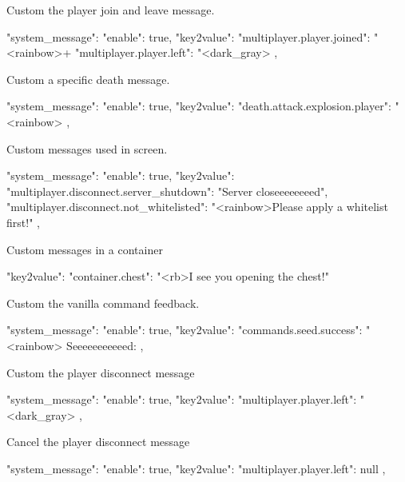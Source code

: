\begin{example}{Custom the player join and leave message.}
    \begin{json}
        "system_message": {
            "enable": true,
            "key2value": {
                "multiplayer.player.joined": "<rainbow>+ %
                "multiplayer.player.left": "<dark_gray>%
            }
        },
    \end{json}

\end{example}

\begin{example}{Custom a specific death message.}
    \begin{json}
        "system_message": {
            "enable": true,
            "key2value": {
                "death.attack.explosion.player": "<rainbow>%
            }
        },
    \end{json}
\end{example}

\begin{example}{Custom messages used in screen.}
    \begin{json}
        "system_message": {
            "enable": true,
            "key2value": {
                "multiplayer.disconnect.server_shutdown": "Server closeeeeeeeed",
                "multiplayer.disconnect.not_whitelisted": "<rainbow>Please apply a whitelist first!"
            }
        },
    \end{json}
\end{example}

\begin{example}{Custom messages in a container}
    \begin{json}
        "key2value": {
            "container.chest": "<rb>I see you opening the chest!"
        }
    \end{json}
\end{example}

\begin{example}{Custom the vanilla command feedback.}
    \begin{json}
        "system_message": {
            "enable": true,
            "key2value": {
                "commands.seed.success": "<rainbow> Seeeeeeeeeeed: %
            }
        },
    \end{json}
\end{example}

\begin{example}{Custom the player disconnect message}
    \begin{json}
        "system_message": {
            "enable": true,
            "key2value": {
                "multiplayer.player.left": "<dark_gray>%
            }
        },
    \end{json}
\end{example}

\begin{example}{Cancel the player disconnect message}
    \begin{json}
        "system_message": {
            "enable": true,
            "key2value": {
                "multiplayer.player.left": null
            }
        },
    \end{json}
\end{example}
